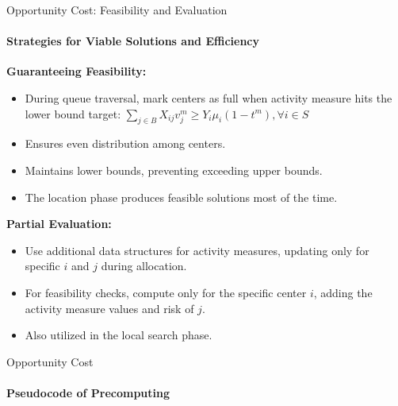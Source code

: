 \documentclass{beamer}
\begin{document}
\begin{frame}{Opportunity Cost: Feasibility and Evaluation}
    \framesubtitle{Strategies for Viable Solutions and Efficiency}

    \textbf{Guaranteeing Feasibility:}
    \begin{itemize}
        \item During queue traversal, mark centers as full when activity measure hits the lower bound target: ${\scriptstyle \sum_{j\in B}X_{ij}v_j^m \ge Y_i\mu_i(1-t^m),  \forall i \in S}$
        \item Ensures even distribution among centers.
        \item Maintains lower bounds, preventing exceeding upper bounds.
        \item The location phase produces feasible solutions most of the time.
    \end{itemize}

    \textbf{Partial Evaluation:}
    \begin{itemize}
        \item Use additional data structures for activity measures, updating only for specific $i$ and $j$ during allocation.
        \item For feasibility checks, compute only for the specific center $i$, adding the activity measure values and risk of $j$.
        \item Also utilized in the local search phase.
    \end{itemize}
\end{frame}

\begin{frame}{Opportunity Cost}
    \framesubtitle{Pseudocode of Precomputing}
\end{frame}
\end{document}
